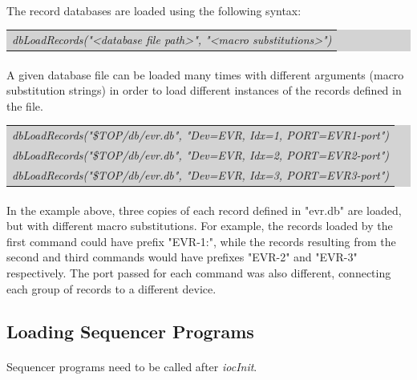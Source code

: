 \documentclass[openany]{article}
\begin{document}
		\paragraph{} The record databases are loaded using the following syntax:

		\bigskip
		\colorbox{lightgray}{
			\begin{tabularx}{0.9\textwidth}{X}
			\emph{dbLoadRecords("\textless database file path\textgreater", "\textless macro substitutions\textgreater")}
			\end{tabularx}
		}

		\paragraph{} A given database file can be loaded many times with different arguments (macro substitution strings) in order to load different instances of the records defined in the file.

		\bigskip
		\colorbox{lightgray}{
			\begin{tabularx}{0.9\textwidth}{X}
			\emph{dbLoadRecords("\${TOP}/db/evr.db", "Dev=EVR, Idx=1, PORT=EVR1-port")} \\
			\emph{dbLoadRecords("\${TOP}/db/evr.db", "Dev=EVR, Idx=2, PORT=EVR2-port")} \\
			\emph{dbLoadRecords("\${TOP}/db/evr.db", "Dev=EVR, Idx=3, PORT=EVR3-port")} \\
			\end{tabularx}
		}
		
		\paragraph{} In the example above, three copies of each record defined in "evr.db" are loaded, but with different macro substitutions. For example, the records loaded by the first command could have prefix "EVR-1:", while the records resulting from the second and third commands would have prefixes "EVR-2" and "EVR-3" respectively. The port passed for each command was also different, connecting each group of records to a different device.

	\subsection{Loading Sequencer Programs}

		\paragraph{} {\color{red}Sequencer programs need to be called after \emph{iocInit}.}
\end{document}
